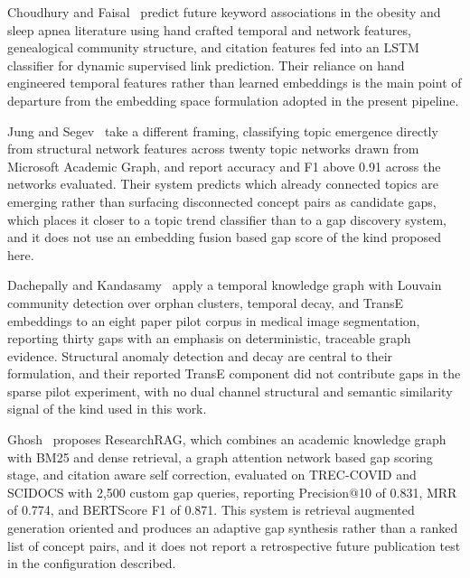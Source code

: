 \documentclass{ieeeaccess}
\begin{document}
Choudhury and Faisal~\cite{choudhury2019miningtemporalevolutionknowledge} predict future keyword associations in the obesity and sleep apnea literature using hand crafted temporal and network features, genealogical community structure, and citation features fed into an LSTM classifier for dynamic supervised link prediction. Their reliance on hand engineered temporal features rather than learned embeddings is the main point of departure from the embedding space formulation adopted in the present pipeline.

Jung and Segev~\cite{jung2022generalizability} take a different framing, classifying topic emergence directly from structural network features across twenty topic networks drawn from Microsoft Academic Graph, and report accuracy and F1 above 0.91 across the networks evaluated. Their system predicts which already connected topics are emerging rather than surfacing disconnected concept pairs as candidate gaps, which places it closer to a topic trend classifier than to a gap discovery system, and it does not use an embedding fusion based gap score of the kind proposed here.

Dachepally and Kandasamy~\cite{dachepally2026} apply a temporal knowledge graph with Louvain community detection over orphan clusters, temporal decay, and TransE embeddings to an eight paper pilot corpus in medical image segmentation, reporting thirty gaps with an emphasis on deterministic, traceable graph evidence. Structural anomaly detection and decay are central to their formulation, and their reported TransE component did not contribute gaps in the sparse pilot experiment, with no dual channel structural and semantic similarity signal of the kind used in this work.

Ghosh~\cite{ghosh2026researchrag} proposes ResearchRAG, which combines an academic knowledge graph with BM25 and dense retrieval, a graph attention network based gap scoring stage, and citation aware self correction, evaluated on TREC-COVID and SCIDOCS with 2,500 custom gap queries, reporting Precision@10 of 0.831, MRR of 0.774, and BERTScore F1 of 0.871. This system is retrieval augmented generation oriented and produces an adaptive gap synthesis rather than a ranked list of concept pairs, and it does not report a retrospective future publication test in the configuration described.
\end{document}
